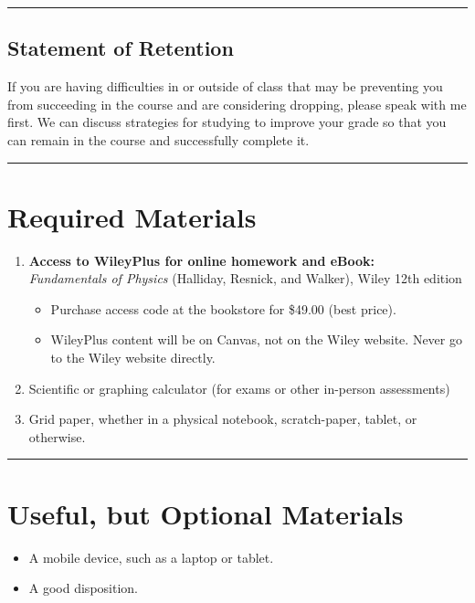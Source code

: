 \documentclass[12pt]{article}
\begin{document}
\medskip
\hrule

\subsection*{Statement of Retention}
If you are having difficulties in or outside of class that may be preventing you from succeeding in the course and are considering dropping, please speak with me first. 
We can discuss strategies for studying to improve your grade so that you can remain in the course and successfully complete it.

\medskip
\hrule

\section*{Required Materials}
\begin{enumerate}[leftmargin=2em,labelsep=0.5em]
\item \textbf{Access to WileyPlus for online homework and eBook:} \\
  \emph{Fundamentals of Physics} (Halliday, Resnick, and Walker), Wiley 12th edition
  \begin{itemize}
    \item Purchase access code at the bookstore for \$49.00 (best price).
    \item WileyPlus content will be on Canvas, not on the Wiley website. Never go to the Wiley website directly.
  \end{itemize}

\item Scientific or graphing calculator (for exams or other in-person assessments)
\item Grid paper, whether in a physical notebook, scratch-paper, tablet, or otherwise.
\end{enumerate}

\medskip
\hrule

\section*{Useful, but Optional Materials}
\begin{itemize}[nosep,leftmargin=1.5em]
    \item A mobile device, such as a laptop or tablet.
    \item A good disposition.
\end{itemize}
\end{document}
